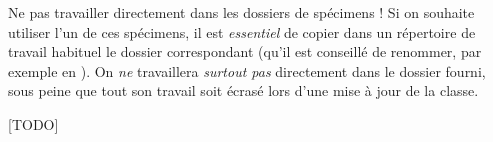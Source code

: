 \begin{dbwarning}{Ne pas travailler directement dans les dossiers de
    spécimens !}{}
  Si on souhaite utiliser l'un de ces spécimens, il est \emph{essentiel} de
  copier dans un répertoire de travail habituel le dossier correspondant (qu'il
  est conseillé de renommer, par exemple en ). On \emph{ne}
  travaillera \emph{surtout pas} directement dans le dossier fourni, sous peine
  que tout son travail soit écrasé lors d'une mise à jour de la classe.
\end{dbwarning}


[TODO]

%
\iffalse
\fi
